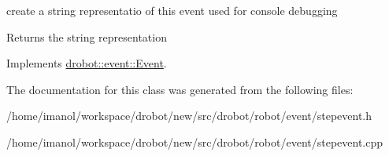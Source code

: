 create a string representatio of this event used for console debugging 

\begin{DoxyReturn}{Returns}
the string representation 
\end{DoxyReturn}


Implements \hyperlink{classdrobot_1_1event_1_1Event_a25b725cbb7dbdb4a41b9c4e9fc3785d8}{drobot\-::event\-::\-Event}.



The documentation for this class was generated from the following files\-:\begin{DoxyCompactItemize}
\item 
/home/imanol/workspace/drobot/new/src/drobot/robot/event/stepevent.\-h\item 
/home/imanol/workspace/drobot/new/src/drobot/robot/event/stepevent.\-cpp\end{DoxyCompactItemize}
